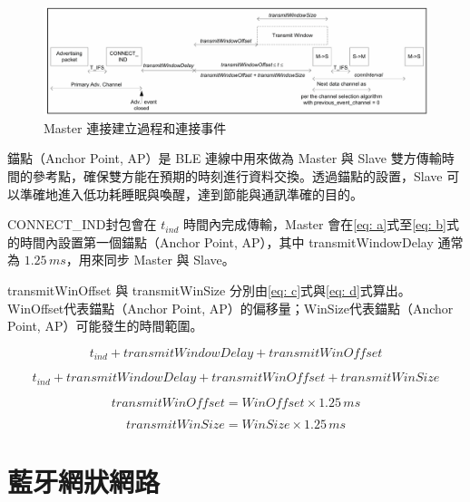 \begin{ZhChapter}
\begin{figure}[H]
    \centering
    \includegraphics[width = 1\textwidth]{image/Master 連接建立過程和連接事件.png}
    \caption{Master 連接建立過程和連接事件\cite{bluetooth2016core}}
    \label{fig: Master 連接建立過程和連接事件}
\end{figure}

錨點（Anchor Point, AP）是 BLE 連線中用來做為 Master 與 Slave 雙方傳輸時間的參考點，確保雙方能在預期的時刻進行資料交換。透過錨點的設置，Slave 可以準確地進入低功耗睡眠與喚醒，達到節能與通訊準確的目的。

CONNECT\_IND封包會在 $t_{ind}$ 時間內完成傳輸，Master 會在\ref{eq: a}式至\ref{eq: b}式的時間內設置第一個錨點（Anchor Point, AP），其中 transmitWindowDelay 通常為 $1.25\,{ms}$，用來同步 Master 與 Slave。

transmitWinOffset 與 transmitWinSize 分別由\ref{eq: c}式與\ref{eq: d}式算出。WinOffset代表錨點（Anchor Point, AP）的偏移量；WinSize代表錨點（Anchor Point, AP）可能發生的時間範圍\cite{10.1145/3412382.3458271}。

\begin{equation}
t_{ind} + transmitWindowDelay + transmitWinOffset
\label{eq: a}
\end{equation}

\begin{equation}
t_{ind} + transmitWindowDelay + transmitWinOffset + transmitWinSize
\label{eq: b}
\end{equation}

\begin{equation}
transmitWinOffset = WinOffset \times 1.25\, ms
\label{eq: c}
\end{equation}

\begin{equation}
transmitWinSize = WinSize \times 1.25\, ms 
\label{eq: d}
\end{equation}

\section{藍牙網狀網路}


\end{ZhChapter}
